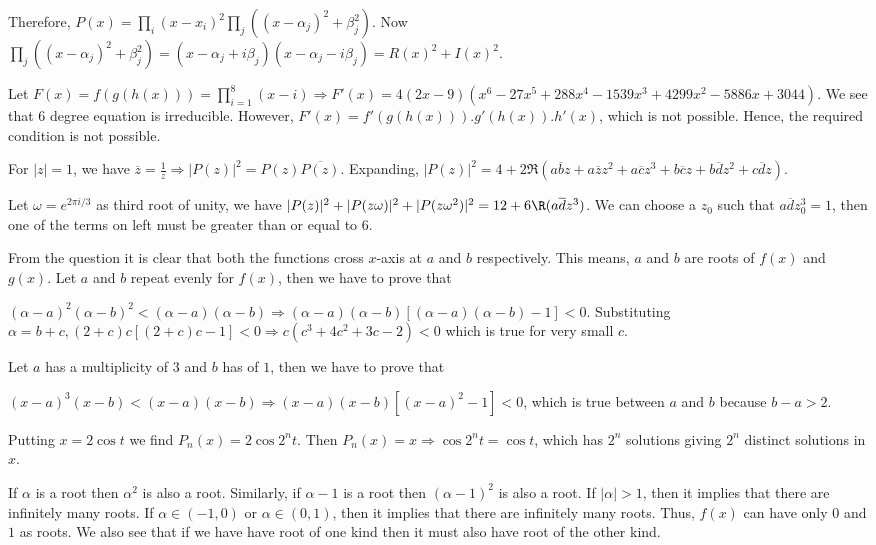   Therefore, $P(x) = \prod_i(x - x_i)^2\prod_j((x - \alpha_j)^2 + \beta_j^2)$. Now $\prod_j((x - \alpha_j)^2
  + \beta_j^2) = (x - \alpha_j + i\beta_j)(x - \alpha_j - i\beta_j) = R(x)^2 + I(x)^2$.
\item Let $F(x) = f(g(h(x))) = \prod_{i=1}^8(x - i)\Rightarrow F'(x) = 4(2x - 9)(x^6 - 27x^5 + 288x^4
  -1539x^3 + 4299x^2 - 5886x + 3044)$. We see that $6$ degree equation is irreducible. However, $F'(x) =
  f'(g(h(x))).g'(h(x)).h'(x)$, which is not possible. Hence, the required condition is not possible.
\item For $|z| = 1$, we have $\overline{z} = \frac{1}{z} \Rightarrow |P(z)|^2 =
  P(z)\overline{P(z)}$. Expanding, $|P(z)|^2 = 4 + 2\Re(a\overline{b}z + a\overline{z}z^2 + a\overline{c}z^3
  + b\overline{c}z + b\overline{d}z^2 + c\overline{d}z)$.

  Let $\omega = e^{2\pi i/3}$ as third root of unity, we have $|P(z)|^2 + |P(z\omega)|^2 + |P(z\omega^2)|^2
  = 12 + 6\R(a\overline{d}z^3)$. We can choose a $z_0$ such that $a\overline{d}z_0^3 = 1$, then one of the
  terms on left must be greater than or equal to $6$.
\item From the question it is clear that both the functions cross $x$-axis at $a$ and $b$ respectively. This
  means, $a$ and $b$ are roots of $f(x)$ and $g(x)$. Let $a$ and $b$ repeat evenly for $f(x)$, then we have
  to prove that

  $(\alpha - a)^2(\alpha - b)^2 < (\alpha - a)(\alpha - b) \Rightarrow (\alpha - a)(\alpha - b)[(\alpha -
    a)(\alpha - b) - 1] < 0$. Substituting $\alpha = b + c, (2 + c)c[(2 + c)c - 1] < 0 \Rightarrow c(c^3 +
  4c^2 + 3c - 2) < 0$ which is true for very small $c$.

  Let $a$ has a multiplicity of $3$ and $b$ has of $1$, then we have to prove that

  $(x - a)^3(x - b) < (x - a)(x - b) \Rightarrow (x - a)(x - b)[(x - a)^2 - 1] < 0$, which is true between
  $a$ and $b$ because $b - a > 2$.
\item Putting $x = 2\cos t$ we find $P_n(x)= 2\cos2^nt$. Then $P_n(x) = x \Rightarrow \cos2^nt = \cos t$,
  which has $2^n$ solutions giving $2^n$ distinct solutions in $x$.
\item If $\alpha$ is a root then $\alpha^2$ is also a root. Similarly, if $\alpha - 1$ is a root then
  $(\alpha - 1)^2$ is also a root. If $|\alpha| > 1$, then it implies that there are infinitely many
  roots. If $\alpha\in(-1, 0)$ or $\alpha\in(0, 1)$, then it implies that there are infinitely many
  roots. Thus, $f(x)$ can have only $0$ and $1$ as roots. We also see that if we have have root of one kind
  then it must also have root of the other kind.

